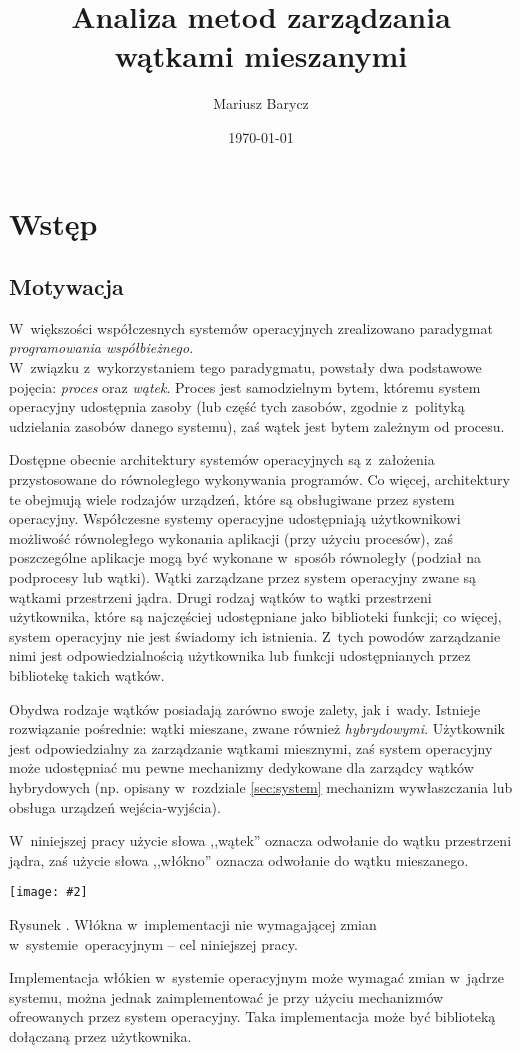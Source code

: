 \documentclass[12pt]{mwart}
\author{Mariusz Barycz}
\title{Analiza metod zarządzania wątkami mieszanymi}
\date{\today}
\newcounter{figmain}
\newcommand{\myownfigure}[4]{ \newcounter{#1} \setcounter{#1}{\value{figmain}} \addtocounter{figmain}{1} \begin{center} \label{fig:#1} \centering \texttt{[image: \#2]}\\ \nopagebreak[5] \parbox[t]{11.5cm}{Rysunek \arabic{#1}. #3.} \end{center}}
\begin{document}
 


\maketitle
\thispagestyle{empty}

\newpage
\tableofcontents
\thispagestyle{empty}
\newpage

\section{Wstęp}
%
\subsection{Motywacja}
\indent
  W~większości współczesnych systemów operacyjnych zrealizowano paradygmat \emph{programowania współbieżnego}.\\
  W~związku z~wykorzystaniem tego paradygmatu, powstały dwa podstawowe pojęcia: \emph{proces} oraz \emph{wątek}.
  Proces jest samodzielnym bytem, któremu system operacyjny udostępnia zasoby (lub część tych zasobów, zgodnie z~polityką udzielania zasobów
  danego systemu), zaś wątek jest bytem zależnym od procesu.
\par
%
\indent
	Dostępne obecnie architektury systemów operacyjnych są z~założenia przystosowane do równoległego
	wykonywania programów. Co więcej, architektury te obejmują wiele rodzajów urządzeń, które są obsługiwane przez system operacyjny.
	Współczesne systemy operacyjne udostępniają użytkownikowi możliwość równoległego wykonania aplikacji (przy użyciu procesów),
	zaś poszczególne aplikacje mogą być wykonane w~sposób równoległy (podział na podprocesy lub wątki). Wątki zarządzane przez system operacyjny
	zwane są wątkami przestrzeni jądra.
	Drugi rodzaj wątków to wątki przestrzeni użytkownika, które są najczęściej udostępniane jako biblioteki funkcji; co więcej, system operacyjny
	nie jest świadomy ich istnienia. Z~tych powodów zarządzanie nimi jest odpowiedzialnością użytkownika lub funkcji udostępnianych przez
	bibliotekę takich wątków.
\par
%
\indent
	Obydwa rodzaje wątków posiadają zarówno swoje zalety, jak i~wady. Istnieje rozwiązanie pośrednie: wątki mieszane, zwane również
	\emph{hybrydowymi}. Użytkownik jest odpowiedzialny za zarządzanie wątkami miesznymi, zaś system operacyjny może udostępniać mu pewne mechanizmy
  dedykowane dla zarządcy wątków hybrydowych (np. opisany w~rozdziale \ref{sec:system} mechanizm wywłaszczania lub obsługa
  urządzeń wejścia-wyjścia).
\par
%
\indent
  W~niniejszej pracy użycie słowa ,,wątek'' oznacza odwołanie do wątku przestrzeni jądra, zaś użycie słowa ,,włókno'' oznacza odwołanie
  do wątku mieszanego.
\par
%
\indent
  \myownfigure{mixedintro}{mixedscheme.png}{Włókna w~implementacji nie wymagającej zmian w~systemie~operacyjnym -- cel niniejszej pracy}{.23}
\par
\indent
  Implementacja włókien w~systemie operacyjnym może wymagać zmian w~jądrze systemu,
  można jednak zaimplementować je przy użyciu mechanizmów ofreowanych przez system operacyjny.
  Taka implementacja może być biblioteką dołączaną przez użytkownika.
\par
%
\end{document}

